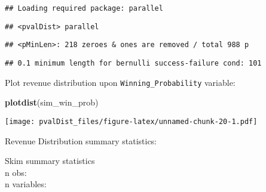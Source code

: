 \documentclass[]{article}
\newenvironment{Shaded}{\begin{snugshade}}{\end{snugshade}}
\newcommand{\CommentTok}[1]{\textcolor[rgb]{0.56,0.35,0.01}{\textit{#1}}}
\newcommand{\KeywordTok}[1]{\textcolor[rgb]{0.13,0.29,0.53}{\textbf{#1}}}
\newcommand{\NormalTok}[1]{#1}
\newcommand{\OperatorTok}[1]{\textcolor[rgb]{0.81,0.36,0.00}{\textbf{#1}}}
\newcommand{\StringTok}[1]{\textcolor[rgb]{0.31,0.60,0.02}{#1}}
\begin{document}
\begin{verbatim}
## Loading required package: parallel
\end{verbatim}

\begin{verbatim}
## <pvalDist> parallel
\end{verbatim}

\begin{verbatim}
## <pMinLen>: 218 zeroes & ones are removed / total 988 p
\end{verbatim}

\begin{verbatim}
## 0.1 minimum length for bernulli success-failure cond: 101
\end{verbatim}

Plot revenue distribution upon \texttt{Winning\_Probability} variable:

\begin{Shaded}
\begin{Highlighting}[]
\KeywordTok{plotdist}\NormalTok{(sim_win_prob)}
\end{Highlighting}
\end{Shaded}

\texttt{[image: pvalDist\_files/figure-latex/unnamed-chunk-20-1.pdf]}

Revenue Distribution summary statistics:

\begin{Shaded}
\end{Shaded}

Skim summary statistics\\
n obs:\\
n variables:
\end{document}
